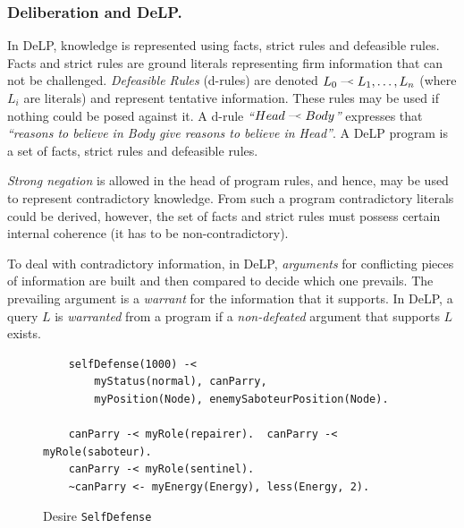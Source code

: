 \subsubsection{Deliberation and DeLP.}
    \newcommand{\drule}[2]{\mbox{$ #1\; \defleftarrow \; #2$}}
    \newcommand{\defleftarrow}{{\raise1.5pt\hbox{\tiny\defleft}}}
    \newcommand{\defleft}{\mbox{---\hspace{-1.5pt}\raise.05pt\hbox{$<$}}}
    In DeLP\cite{Garcia:2004a}, knowledge is represented using facts, strict rules
    and defeasible rules. Facts and strict rules are ground literals representing
    firm information that can not be challenged. \textit{Defeasible Rules}
    (d-rules) are denoted $\drule{L_0}{L_1, \ldots, L_n}$ (where $L_i$ are literals)
    and represent tentative information. These rules may be used if nothing could
    be posed against it. A d-rule \textit{``\drule{Head}{Body}''} expresses that
    \textit{``reasons to believe in Body give reasons to believe in Head''}. A DeLP
    program is a set of facts, strict rules and defeasible rules. 

    {\it Strong negation} is allowed in the head of program rules, and hence, may
    be used to represent contradictory knowledge. From such a program contradictory
    literals could be derived, however,  the set of facts and strict rules must
    possess certain internal coherence (it has to be non-contradictory). 

    To deal with contradictory information, in DeLP, \emph{arguments} for
    conflicting pieces of information are built and then compared to decide
    which one prevails. The prevailing argument is a \emph{warrant} for the
    information that it supports.  In DeLP, a query $L$ is \emph{warranted} from
    a program if a \emph{non-defeated} argument that supports $L$ exists. %
    
    \begin{figure}
    \begin{small}
    \begin{Verbatim}
    selfDefense(1000) -<
        myStatus(normal), canParry,
        myPosition(Node), enemySaboteurPosition(Node).  

    canParry -< myRole(repairer).  canParry -< myRole(saboteur).
    canParry -< myRole(sentinel).  
    ~canParry <- myEnergy(Energy), less(Energy, 2). 
    \end{Verbatim}
    \end{small}
    \caption{Desire \texttt{SelfDefense}}
    \label{fig:SelfDefense}
    \end{figure}
    
